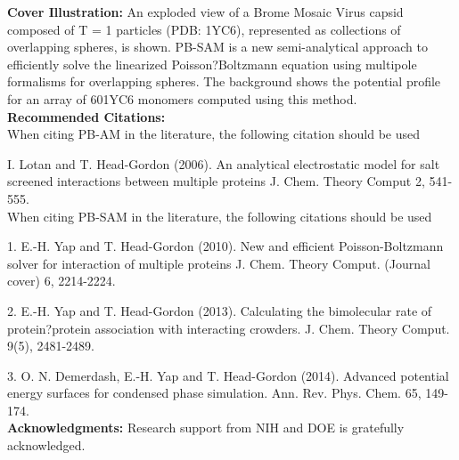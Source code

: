 
\textbf{Cover Illustration:} An exploded view of a Brome Mosaic Virus capsid 
composed of T = 1 particles (PDB: 1YC6), 
represented as collections of overlapping spheres, is shown. 
PB-SAM is a new semi-analytical approach to efficiently solve the 
linearized Poisson?Boltzmann equation using multipole formalisms for overlapping spheres. 
The background shows the potential profile for an array of 601YC6 monomers computed using this method. \\



\textbf{Recommended Citations:} \\

When citing PB-AM in the literature, the following citation should be used

I. Lotan and T. Head-Gordon (2006). An analytical electrostatic model for salt screened interactions between multiple proteins  J. Chem. Theory Comput 2, 541-555. \\ 


When citing PB-SAM in the literature, the following citations should be used

1.  E.-H. Yap and T. Head-Gordon (2010). New and efficient Poisson-Boltzmann solver for interaction of multiple proteins  J. Chem. Theory Comput. (Journal cover) 6, 2214-2224.

2.  E.-H. Yap and T. Head-Gordon (2013). Calculating the bimolecular rate of protein?protein association with interacting crowders.  J. Chem. Theory Comput. 9(5), 2481-2489.

3.   O. N. Demerdash, E.-H. Yap and T. Head-Gordon (2014). Advanced potential energy surfaces for condensed phase simulation.  Ann. Rev. Phys. Chem. 65, 149-174.   \\



\textbf{Acknowledgments:} Research support from NIH and DOE is gratefully acknowledged. \\
